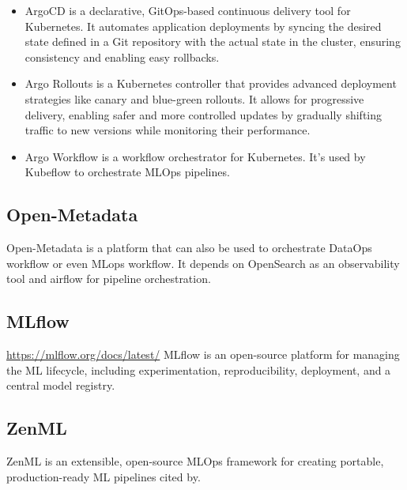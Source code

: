 \begin{itemize}
    \item ArgoCD
     is a declarative, GitOps-based continuous delivery tool for Kubernetes.
     It automates application deployments by syncing the desired state
     defined in a Git repository with the actual state in the cluster,
     ensuring consistency and enabling easy rollbacks.

    \item Argo Rollouts
     is a Kubernetes controller that provides advanced deployment strategies
     like canary and blue-green rollouts.
     It allows for progressive delivery, enabling safer and more controlled updates by gradually
     shifting traffic to new versions while monitoring their performance.

    \item Argo Workflow
    is a workflow orchestrator for Kubernetes.
    It's used by Kubeflow to orchestrate MLOps pipelines.

\end{itemize}

\subsection{Open-Metadata}\label{subsec:openmetadata}

Open-Metadata is a platform that can also be used to orchestrate DataOps workflow or even MLops workflow.
It depends on OpenSearch as an observability tool and airflow for pipeline orchestration.

\subsection{MLflow}\url{https://mlflow.org/docs/latest/}
MLflow is an open-source platform for managing the ML lifecycle, including experimentation, reproducibility,
deployment, and a central model registry.\cite{mlflow}

\subsection{ZenML}
ZenML is an extensible, open-source MLOps framework for creating portable, production-ready ML pipelines cited by\cite{blockchain-mlops}.

